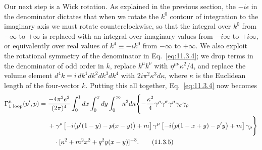 Our next step is a Wick rotation. As explained in the previous section, the
$-i\epsilon$ in the denominator dictates that when we rotate the $k^0$
contour of integration to the imaginary axis we must rotate counterclockwise,
so that the integral over $k^0$ from $-\infty$ to $+\infty$ is replaced with
an integral over imaginary values from $-i\infty$ to $+i\infty$, or
equivalently over real values of $k^4\equiv-ik^0$ from $-\infty$ to
$+\infty$. We also exploit the rotational symmetry of the denominator in
Eq.~\eqref{eq:11.3.4}; we drop terms in the denominator of odd order in $k$, replace
$k^\mu k^\nu$ with $\eta^{\mu\nu}\kappa^2/4$, and replace the volume element
$d^4k=i\,dk^1dk^2dk^3dk^4$ with $2i\pi^2\kappa^3d\kappa$, where $\kappa$
is the Euclidean length of the four-vector $k$. Putting this all together,
Eq.~\eqref{eq:11.3.4} now becomes
\begin{align}
\Gamma^\mu_{\text{1 loop}}(p',p)={}&{-4\pi^2e^2\over(2\pi)^4}
 \int_0^1dx\int_0^xdy\int_0^\infty\kappa^3d\kappa
 \Biggl\{-{\kappa^2\over4}
 \gamma^\rho\gamma^\sigma\gamma^\mu\gamma_\sigma\gamma_\rho
\notag\\
&+\gamma^\rho
 \left[-i\bigl(\sl{p}'(1-y)-\sl{p}(x-y)\bigr)+m\right]\gamma^\mu
 \left[-i\bigl(\sl{p}(1-x+y)-\sl{p}'y\bigr)+m\right]\gamma_\rho
 \Biggr\}\notag\\
&\quad\cdot[\kappa^2+m^2x^2+q^2y(x-y)]^{-3}.
\tag{11.3.5}\label{eq:11.3.5}
\end{align}

